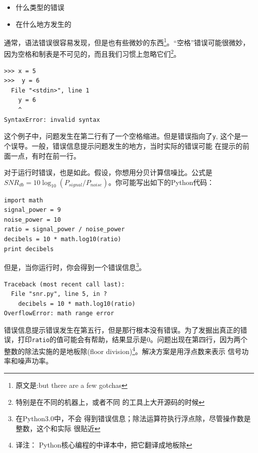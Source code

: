 {{\begin{itemize}

\item 什么类型的错误

\item 在什么地方发生的

\end{itemize}

 通常，语法错误很容易发现，但是也有些微妙的东西\footnote{原文是:but 
there are a few gotchas}。“空格”错误可能很微妙，因为空格和制表是不可见的，而且我们习惯上忽略它们\footnote{特别是在不同的机器上，或者不同
的工具上大开源码的时候}。


 
\beforeverb
\begin{verbatim}
>>> x = 5
>>>  y = 6
  File "<stdin>", line 1
    y = 6
    ^
SyntaxError: invalid syntax
\end{verbatim}
\afterverb

这个例子中，问题发生在第二行有了一个空格缩进。但是错误指向了{\tt y},
这个是一个误导。一般，错误信息提示问题发生的地方，当时实际的错误可能
在提示的前面一点，有时在前一行。


对于运行时错误，也是如此。假设，你想用分贝计算信噪比。公式是$SNR_{db} = 10 \log_{10} (P_{signal} / P_{noise})$。你可能写出如下的Python代码：

\beforeverb
\begin{verbatim}
import math
signal_power = 9
noise_power = 10
ratio = signal_power / noise_power
decibels = 10 * math.log10(ratio)
print decibels
\end{verbatim}
\afterverb
但是，当你运行时，你会得到一个错误信息\footnote{在Python3.0中，不会
得到错误信息；除法运算符执行浮点除，尽管操作数是整数，这个和实际
很贴近}。


\beforeverb
\begin{verbatim}
Traceback (most recent call last):
  File "snr.py", line 5, in ?
    decibels = 10 * math.log10(ratio)
OverflowError: math range error
\end{verbatim}
\afterverb

错误信息提示错误发生在第五行，但是那行根本没有错误。为了发掘出真正的错误，打印{\tt ratio}的值可能会有帮助，结果显示是0。问题出现在第四行，因为两个整数的除法实施的是地板除(floor division)\footnote{译注：
Python核心编程的中译本中，把它翻译成地板除}。解决方案是用浮点数来表示
信号功率和噪声功率。

}}
